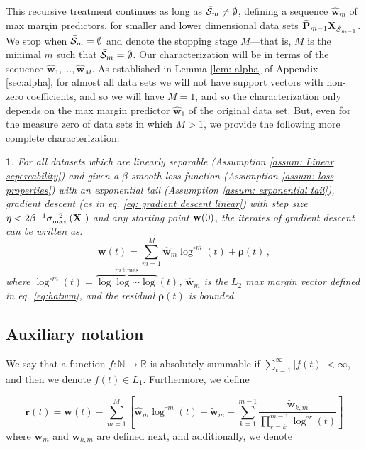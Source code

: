 \documentclass[twoside,11pt,english]{article}
\newtheorem{thm}{\protect\theoremname}
\providecommand{\theoremname}{Theorem}
\providecommand{\theoremname}{Theorem}
\begin{document}
This recursive treatment continues as long as $\bar{\mathcal{S}}_m\neq\emptyset$, defining a sequence $\hat{\mathbf{w}}_m$ of max margin predictors, for smaller and lower dimensional data sets $\bar{\mathbf{P}}_{m-1} \mathbf{X}_{\bar{\mathcal{S}}_{m-1}}$.  We stop when $\bar{\mathcal{S}}_m=\emptyset$ and denote the stopping stage $M$---that is, $M$ is the minimal $m$ such that $\bar{\mathcal{S}}_m=\emptyset$.  Our characterization will be in terms of the sequence $\hat{\mathbf{w}}_1,\ldots,\hat{\mathbf{w}}_M$.  As established in Lemma \ref{lem: alpha} of Appendix \ref{sec:alpha}, for almost all data sets we will not have support vectors with non-zero coefficients, and so we will have $M=1$, and so the characterization only depends on the max margin predictor $\hat{\mathbf{w}}_1$ of the original data set.  But, even for the measure zero of data sets in which $M>1$, we provide the following more complete characterization:
\begin{thm}
\label{theorem: main2}For all datasets which are linearly
separable (Assumption \ref{assum: Linear sepereability}) and given
a $\beta$-smooth loss function (Assumption \ref{assum: loss properties})
with an exponential tail (Assumption \ref{assum: exponential tail}), gradient descent (as in eq. \ref{eq: gradient descent linear})
with step size $\eta<2\beta^{-1}\sigma_{\max}^{-2}\left(\text{\ensuremath{\mathbf{X}} }\right)$
and any starting point $\mathbf{w}(0)$, the iterates of gradient descent can be written as:
\begin{equation}
\mathbf{w}\left(t\right)=\sum_{m=1}^{M}\hat{\mathbf{w}}_{m}\log^{\circ m}\left(t\right)+\boldsymbol{\rho}\left(t\right)\,,\label{eq: asymptotic form-1}
\end{equation}
where $\log^{\circ m}\left(t\right)=\overbrace{\log\log\cdots\log}^{m\,\mathrm{times}}\left(t\right)$,
$\hat{\mathbf{w}}_{m}$ is the $L_2$ max margin vector defined in eq.
\ref{eq:hatwm}, and the residual $\boldsymbol{\rho}\left(t\right)$
is bounded. 
\end{thm}


\subsection{Auxiliary notation}

We say that a function $f:\mathbb{N}\rightarrow\mathbb{R}$ is absolutely
summable if $\sum_{t=1}^{\infty}\left|f\left(t\right)\right|<\infty$,
and then we denote $f\left(t\right)\in L_{1}$. Furthermore, we define

\[
\mathbf{r}\left(t\right)=\mathbf{w}\left(t\right)-\sum_{m=1}^{M}\left[\hat{\mathbf{w}}_{m}\log^{\circ m}\left(t\right)+\tilde{\mathbf{w}}_{m}+\sum_{k=1}^{m-1}\frac{\check{\mathbf{w}}_{k,m}}{\prod_{r=k}^{m-1}\log^{\circ r}\left(t\right)}\right]
\]
where $\tilde{\mathbf{w}}_{m}$ and $\check{\mathbf{w}}_{k,m}$ are
defined next, and additionally, we denote
\end{document}
